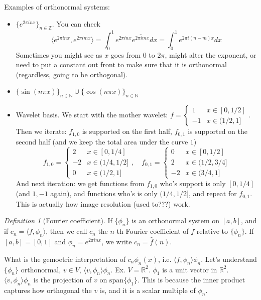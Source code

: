 \documentclass{article}
\theoremstyle{plain}
\theoremstyle{remark}
\newtheorem{definition}{Definition}
\newcommand{\N}{{\mathbb N}}
\newcommand{\Z}{{\mathbb Z}}
\newcommand{\R}{{\mathbb R}}
\begin{document}
Examples of orthonormal systems:
\begin{itemize}
	\item $\{ e^{2 \pi i n x}\}_{n \in \Z}$.
		You can check
		\[
			\langle e^{2 \pi i nx}, e^{2\pi i m x} \rangle
			= \int_0^1 e^{2\pi i n x} \overline{e^{2\pi i m x}}dx
			= \int_0^1 e^{2\pi i(n - m)x}dx
		\]
		Sometimes you might see as $x$ goes from $0$ to $2\pi$,
		might alter the exponent, or need to put a constant out front
		to make sure that it is orthonormal (regardless, going to be orthogonal).
	\item $\{\sin(n\pi x)\}_{n \in \N} \cup \{ \cos(n \pi x)\}_{n \in \N}$
	\item Wavelet basis.
		We start with the mother wavelet:
		$f = \begin{cases} 1 & x \in [0,1/2]\\ -1 & x \in (1/2,1] \end{cases}$.
		Then we iterate: $f_{1,0}$ is supported on the first half,
		$f_{0,1}$ is supported on the second half
		(and we keep the total area under the curve $1$)
		\[
			f_{1,0} =
			\begin{cases}
				2 & x \in [0,1/4]\\ -2 & x \in (1/4,1/2]\\ 0 & x \in (1/2,1]
			\end{cases}, \quad
			f_{0,1} =
			\begin{cases}
				0 & x \in [0,1/2]\\
				2 & x \in (1/2,3/4]\\
				-2 & x \in (3/4,1]
			\end{cases}
		\]
		And next iteration: we get functions from $f_{1,0}$
		who's support is only $[0,1/4]$ (and $1,-1$ again),
		and functions who's is only $(1/4,1/2]$,
		and repeat for $f_{0,1}$.
		This is actually how image resolution (used to???) work.
\end{itemize}

\begin{definition}[Fourier coefficient]
	If $\{\phi_n\}$ is an orthonormal system on $[a,b]$,
	and if $c_n = \langle f, \phi_n \rangle$, then we call $c_n$
	the $n$-th Fourier coefficient of $f$ relative to $\{\phi_n\}$.
	If $[a,b] = [0,1]$ and $\phi_n = e^{2\pi i nx}$,
	we write $c_n = \hat{f}(n)$.
\end{definition}
What is the gemoetric interpretation of $c_n \phi_n(x)$,
i.e. $\langle f, \phi_n \rangle\phi_n$.
Let's understand $\{ \phi_n \}$ orthonormal, $v \in V$,
$\langle v , \phi_n \rangle \phi_n$.
Ex. $V = \R^2$.
$\phi_1$ is a unit vector in $\R^2$.
$\langle v, \phi_n \rangle \phi_n$ is the projection of $v$
on $\mathrm{span}\{\phi_1\}$.
This is because the inner product captures how orthogonal the $v$ is,
and it is a scalar multiple of $\phi_n$.
\end{document}
